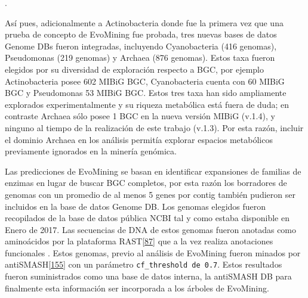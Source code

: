 \documentclass[12pt,twoside]{reedthesis}
\begin{document}
  .
  
  Así pues, adicionalmente a Actinobacteria donde fue la primera vez que
  una prueba de concepto de EvoMining fue probada, tres nuevas bases de
  datos Genome DBs fueron integradas, incluyendo Cyanobacteria (416
  genomas), Pseudomonas (219 genomas) y Archaea (876 genomas). Estos taxa
  fueron elegidos por su diversidad de exploración respecto a BGC, por
  ejemplo Actinobacteria posee 602 MIBiG BGC, Cyanobacteria cuenta con 60
  MIBiG BGC y Pseudomonas 53 MIBiG BGC. Estos tres taxa han sido
  ampliamente explorados experimentalmente y su riqueza metabólica está
  fuera de duda; en contraste Archaea sólo posee 1 BGC en la nueva versión
  MIBiG (v.1.4), y ninguno al tiempo de la realización de este trabajo
  (v.1.3). Por esta razón, incluir el dominio Archaea en los análisis
  permitía explorar espacios metabólicos previamente ignorados en la
  minería genómica.
  
  Las predicciones de EvoMining se basan en identificar expansiones de
  familias de enzimas en lugar de buscar BGC completos, por esta razón los
  borradores de genomas con un promedio de al menos 5 genes por contig
  también pudieron ser incluidos en la base de datos Genome DB. Los
  genomas elegidos fueron recopilados de la base de datos pública NCBI tal
  y como estaba disponible en Enero de 2017. Las secuencias de DNA de
  estos genomas fueron anotadas como aminoácidos por la plataforma
  RAST{[}\protect\hyperlink{ref-overbeek_seed_2014}{87}{]} que a la vez
  realiza anotaciones funcionales . Estos genomas, previo al análisis de
  EvoMining fueron minados por
  antiSMASH{[}\protect\hyperlink{ref-weber_antismash3_2015}{155}{]} con un
  parámetro \texttt{cf\_threshold\ de\ 0.7}. Estos resultados fueron
  suministrados como una base de datos interna, la antiSMASH DB para
  finalmente esta información ser incorporada a los árboles de EvoMining.
  
\end{document}
